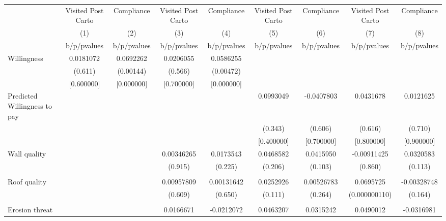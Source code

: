 {
\def\sym#1{\ifmmode^{#1}\else\(^{#1}\)\fi}
\begin{tabular}{l*{8}{c}}
\toprule
                &\multicolumn{1}{c}{Visited Post Carto}&\multicolumn{1}{c}{Compliance}&\multicolumn{1}{c}{Visited Post Carto}&\multicolumn{1}{c}{Compliance}&\multicolumn{1}{c}{Visited Post Carto}&\multicolumn{1}{c}{Compliance}&\multicolumn{1}{c}{Visited Post Carto}&\multicolumn{1}{c}{Compliance}\\
                &\multicolumn{1}{c}{(1)}&\multicolumn{1}{c}{(2)}&\multicolumn{1}{c}{(3)}&\multicolumn{1}{c}{(4)}&\multicolumn{1}{c}{(5)}&\multicolumn{1}{c}{(6)}&\multicolumn{1}{c}{(7)}&\multicolumn{1}{c}{(8)}\\
                &b/p/pvalues&b/p/pvalues&b/p/pvalues&b/p/pvalues&b/p/pvalues&b/p/pvalues&b/p/pvalues&b/p/pvalues\\
\midrule
Willingness     &0.0181072&0.0692262&0.0206055&0.0586255&         &         &         &         \\
                &  (0.611)&(0.00144)&  (0.566)&(0.00472)&         &         &         &         \\
                &[0.600000]&[0.000000]&[0.700000]&[0.000000]&         &         &         &         \\
Predicted Willingness to pay&         &         &         &         &0.0993049&-0.0407803&0.0431678&0.0121625\\
                &         &         &         &         &  (0.343)&  (0.606)&  (0.616)&  (0.710)\\
                &         &         &         &         &[0.400000]&[0.700000]&[0.800000]&[0.900000]\\
Wall quality    &         &         &0.00346265&0.0173543&0.0468582&0.0415950&-0.00911425&0.0320583\\
                &         &         &  (0.915)&  (0.225)&  (0.206)&  (0.103)&  (0.860)&  (0.113)\\
                &         &         &         &         &         &         &         &         \\
Roof quality    &         &         &0.00957809&0.00131642&0.0252926&0.00526783&0.0695725&-0.00328748\\
                &         &         &  (0.609)&  (0.650)&  (0.111)&  (0.264)&(0.000000110)&  (0.164)\\
                &         &         &         &         &         &         &         &         \\
Erosion threat  &         &         &0.0166671&-0.0212072&0.0463207&0.0315242&0.0490012&-0.0316981\\

\end{tabular}}
